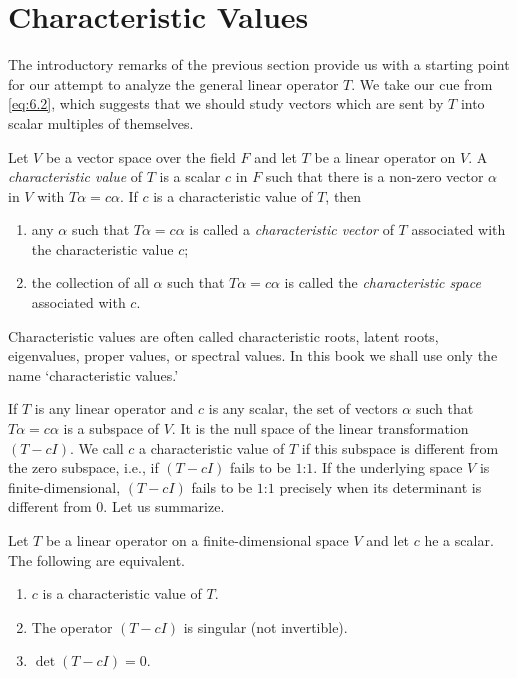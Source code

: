 \section{Characteristic Values}

The introductory remarks of the previous section provide us with a starting point for our attempt to analyze the general linear operator \(T\). We take our cue from \eqref{eq:6.2}, which suggests that we should study vectors which are sent by \(T\) into scalar multiples of themselves.

\begin{definition}
    Let \(V\) be a vector space over the field \(F\) and let \(T\) be a linear operator on \(V\). A \emph{characteristic value} of \(T\) is a scalar \(c\) in \(F\) such that there is a non-zero vector \(\alpha\) in \(V\) with \(T\alpha=c\alpha\). If \(c\) is a characteristic value of \(T\), then
    \begin{enumerate}
        \item any \(\alpha\) such that \(T\alpha=c\alpha\) is called a \emph{characteristic vector} of \(T\) associated with the characteristic value \(c\);
        \item the collection of all \(\alpha\) such that \(T\alpha=c\alpha\) is called the \emph{characteristic space} associated with \(c\).
    \end{enumerate}
\end{definition}

Characteristic values are often called characteristic roots, latent roots, eigenvalues, proper values, or spectral values. In this book we shall use only the name `characteristic values.'

If \(T\) is any linear operator and \(c\) is any scalar, the set of vectors \(\alpha\) such that \(T\alpha=c\alpha\) is a subspace of \(V\). It is the null space of the linear transformation \(\left(T-cI\right)\). We call \(c\) a characteristic value of \(T\) if this subspace is different from the zero subspace, i.e., if \(\left(T-cI\right)\) fails to be \(1\):\(1\). If the underlying space \(V\) is finite-dimensional, \(\left(T-cI\right)\) fails to be \(1\):\(1\) precisely when its determinant is different from \(0\). Let us summarize.

\begin{theorem}
    Let \(T\) be a linear operator on a finite-dimensional space \(V\) and let \(c\) he a scalar. The following are equivalent.
    \begin{enumerate}
        \item \(c\) is a characteristic value of \(T\).
        \item The operator \(\left(T-cI\right)\) is singular (not invertible).
        \item\label{itm:6.5} \(\det\left(T-cI\right)=0\).
    \end{enumerate}
\end{theorem}

